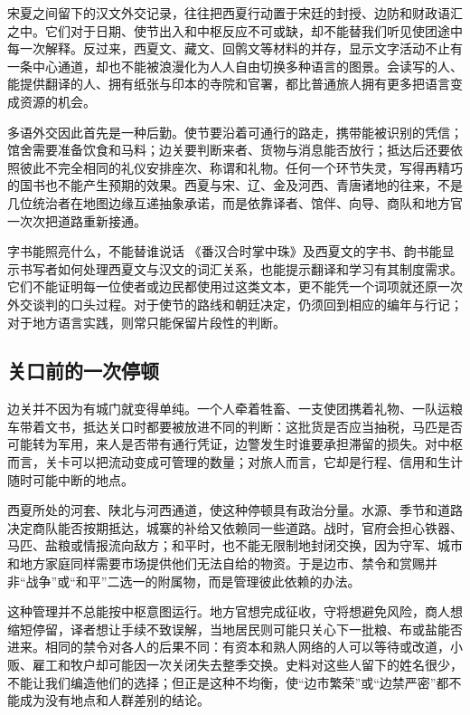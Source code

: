 宋夏之间留下的汉文外交记录，往往把西夏行动置于宋廷的封授、边防和财政语汇之中。它们对于日期、使节出入和中枢反应不可或缺，却不能替我们听见使团途中每一次解释。反过来，西夏文、藏文、回鹘文等材料的并存，显示文字活动不止有一条中心通道，却也不能被浪漫化为人人自由切换多种语言的图景。会读写的人、能提供翻译的人、拥有纸张与印本的寺院和官署，都比普通旅人拥有更多把语言变成资源的机会。

多语外交因此首先是一种后勤。使节要沿着可通行的路走，携带能被识别的凭信；馆舍需要准备饮食和马料；边关要判断来者、货物与消息能否放行；抵达后还要依照彼此不完全相同的礼仪安排座次、称谓和礼物。任何一个环节失灵，写得再精巧的国书也不能产生预期的效果。西夏与宋、辽、金及河西、青唐诸地的往来，不是几位统治者在地图边缘互递抽象承诺，而是依靠译者、馆伴、向导、商队和地方官一次次把道路重新接通。

\begin{sourcenote}{字书能照亮什么，不能替谁说话}
《番汉合时掌中珠》及西夏文的字书、韵书能显示书写者如何处理西夏文与汉文的词汇关系，也能提示翻译和学习有其制度需求。它们不能证明每一位使者或边民都使用过这类文本，更不能凭一个词项就还原一次外交谈判的口头过程。对于使节的路线和朝廷决定，仍须回到相应的编年与行记；对于地方语言实践，则常只能保留片段性的判断。
\end{sourcenote}

\subsection{关口前的一次停顿}

边关并不因为有城门就变得单纯。一个人牵着牲畜、一支使团携着礼物、一队运粮车带着文书，抵达关口时都要被放进不同的判断：这批货是否应当抽税，马匹是否可能转为军用，来人是否带有通行凭证，边警发生时谁要承担滞留的损失。对中枢而言，关卡可以把流动变成可管理的数量；对旅人而言，它却是行程、信用和生计随时可能中断的地点。

西夏所处的河套、陕北与河西通道，使这种停顿具有政治分量。水源、季节和道路决定商队能否按期抵达，城寨的补给又依赖同一些道路。战时，官府会担心铁器、马匹、盐粮或情报流向敌方；和平时，也不能无限制地封闭交换，因为守军、城市和地方家庭同样需要市场提供他们无法自给的物资。于是边市、禁令和赏赐并非“战争”或“和平”二选一的附属物，而是管理彼此依赖的办法。

这种管理并不总能按中枢意图运行。地方官想完成征收，守将想避免风险，商人想缩短停留，译者想让手续不致误解，当地居民则可能只关心下一批粮、布或盐能否进来。相同的禁令对各人的后果不同：有资本和熟人网络的人可以等待或改道，小贩、雇工和牧户却可能因一次关闭失去整季交换。史料对这些人留下的姓名很少，不能让我们编造他们的选择；但正是这种不均衡，使“边市繁荣”或“边禁严密”都不能成为没有地点和人群差别的结论。


